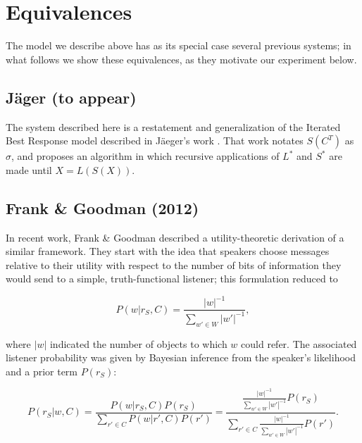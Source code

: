 \section{Equivalences}

The model we describe above has as its special case several previous systems; in what follows we show these equivalences, as they motivate our experiment below.

\subsection{J\"ager (to appear)}

The system described here is a restatement and generalization of the Iterated Best Response model described in J\"aeger's work \cite{jaegerinpress}. That work notates $S(C^T)$ as $\sigma$, and proposes an algorithm in which recursive applications of $L^*$ and $S^*$ are made until $X = L(S(X))$. 

\subsection{Frank \& Goodman (2012)}

In recent work, Frank \& Goodman \cite{frank2012} described a utility-theoretic derivation of a similar framework. They start with the idea that speakers choose messages relative to their utility with respect to the number of bits of information they would send to a simple, truth-functional listener; this formulation reduced to

\begin{equation}
P(w|r_S,C) = \frac{|w|^{-1}}{\displaystyle \sum_{w' \in W} {|w'|^{-1}}},
\end{equation}

where $|w|$ indicated the number of objects to which $w$ could refer. The associated listener probability was given by Bayesian inference from the speaker's likelihood and a prior term $P(r_S)$:

\begin{equation}
\label{eq:fg}
P(r_S | w, C) 
= \frac{P(w | r_S, C) P(r_S)}{\displaystyle \sum_{r' \in C}{P(w | r', C) P(r')}} =
\frac{\frac{\displaystyle |w|^{-1}}{\displaystyle \sum_{w' \in W} {|w'|^{-1}}}P(r_S)}{\displaystyle \sum_{r' \in C}{\frac{|w|^{-1}}{\displaystyle \sum_{w' \in W} {|w'|^{-1}}}P(r')}}.
\end{equation}

